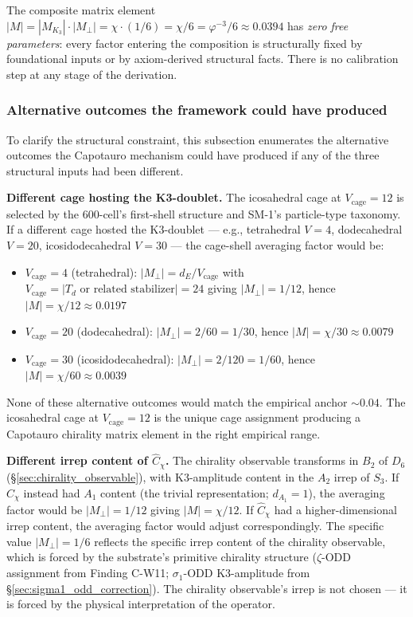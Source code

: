 \documentclass[11pt,letterpaper]{article}
\newcommand{\phig}{\varphi}
\newcommand{\Cchi}{\hat{C}_\chi}
\newcommand{\Dsix}{D_6}
\newcommand{\Sthree}{S_3}
\begin{document}
The composite matrix element $|M| = |M_{K_3}| \cdot |M_\perp| = \chi \cdot (1/6) = \chi/6 = \phig^{-3}/6 \approx 0.0394$ has \emph{zero free parameters}: every factor entering the composition is structurally fixed by foundational inputs or by axiom-derived structural facts. There is no calibration step at any stage of the derivation.

\subsubsection{Alternative outcomes the framework could have produced}\label{sec:alternatives}

To clarify the structural constraint, this subsection enumerates the alternative outcomes the Capotauro mechanism could have produced if any of the three structural inputs had been different.

\textbf{Different cage hosting the K3-doublet.} The icosahedral cage at $V_\text{cage} = 12$ is selected by the 600-cell's first-shell structure and SM-1's particle-type taxonomy. If a different cage hosted the K3-doublet --- e.g., tetrahedral $V = 4$, dodecahedral $V = 20$, icosidodecahedral $V = 30$ --- the cage-shell averaging factor would be:
\begin{itemize}\setlength\itemsep{0.2em}
    \item $V_\text{cage} = 4$ (tetrahedral): $|M_\perp| = d_E/V_\text{cage}$ with $V_\text{cage} = |T_d \text{ or related stabilizer}| = 24$ giving $|M_\perp| = 1/12$, hence $|M| = \chi/12 \approx 0.0197$
    \item $V_\text{cage} = 20$ (dodecahedral): $|M_\perp| = 2/60 = 1/30$, hence $|M| = \chi/30 \approx 0.0079$
    \item $V_\text{cage} = 30$ (icosidodecahedral): $|M_\perp| = 2/120 = 1/60$, hence $|M| = \chi/60 \approx 0.0039$
\end{itemize}
None of these alternative outcomes would match the empirical anchor $\sim 0.04$. The icosahedral cage at $V_\text{cage} = 12$ is the unique cage assignment producing a Capotauro chirality matrix element in the right empirical range.

\textbf{Different irrep content of $\Cchi$.} The chirality observable transforms in $B_2$ of $\Dsix$ (\S\ref{sec:chirality_observable}), with K3-amplitude content in the $A_2$ irrep of $\Sthree$. If $\Cchi$ instead had $A_1$ content (the trivial representation; $d_{A_1} = 1$), the averaging factor would be $|M_\perp| = 1/12$ giving $|M| = \chi/12$. If $\Cchi$ had a higher-dimensional irrep content, the averaging factor would adjust correspondingly. The specific value $|M_\perp| = 1/6$ reflects the specific irrep content of the chirality observable, which is forced by the substrate's primitive chirality structure ($\zeta$-ODD assignment from Finding C-W11; $\sigma_1$-ODD K3-amplitude from \S\ref{sec:sigma1_odd_correction}). The chirality observable's irrep is not chosen --- it is forced by the physical interpretation of the operator.
\end{document}
